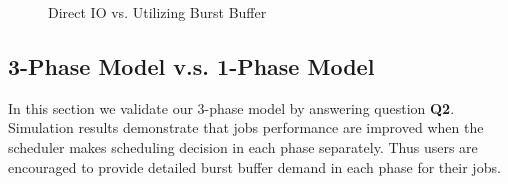 \begin{figure}[!t]
        \centering
        \caption{Direct IO vs. Utilizing Burst Buffer}
        \label{Fig:DirectIOPerformance}
\end{figure}



\subsection{3-Phase Model v.s. 1-Phase Model}
In this section we validate our 3-phase model by answering question \textbf{Q2}.
Simulation results demonstrate that jobs performance are improved 
when the scheduler makes scheduling decision in each phase separately.
Thus users are encouraged to provide detailed burst buffer demand in each phase for their jobs.

